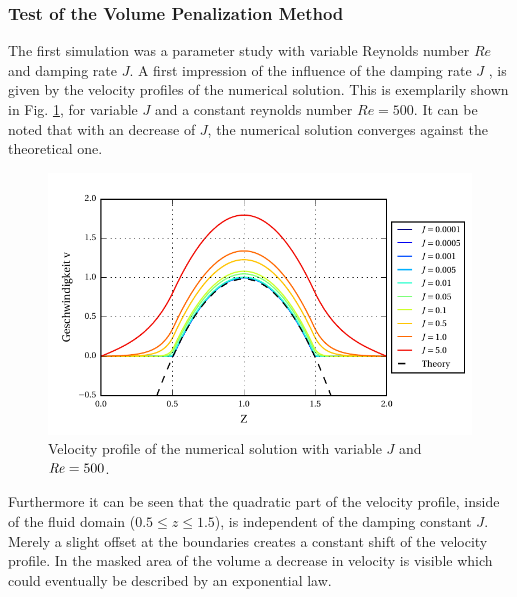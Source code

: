 \clearpage


\subsubsection{Test of the Volume Penalization Method}

The first simulation was  a parameter study with variable Reynolds number $Re$ and damping rate $J$.
A first impression of the influence of the damping rate $J$ , is given by the velocity profiles of the numerical solution.
This is exemplarily shown in Fig. \ref{fig:vp_flow}, for variable $J$ and a constant reynolds number $Re=500$.
It can be noted that with an decrease of $J$, the numerical solution converges against the theoretical one.

\begin{figure}[!b]
  \centering
  \includegraphics{gfx/immersed_boundary/poiseuille_flow/2_vp/vp_profile.pdf}  \caption{\label{fig:vp_flow}
    Velocity profile of the numerical solution with variable $J$ and $\mbox{\textit{Re}} = 500$.}
\end{figure}

Furthermore it can be seen that the quadratic part of the velocity profile,
inside of the fluid domain ($0.5\leq z \leq 1.5$), is independent of the damping constant $J$.
Merely a slight offset at the boundaries creates a constant shift of the velocity profile.
In the masked area of the volume a decrease in velocity is visible which could  eventually be described by an
exponential law.

